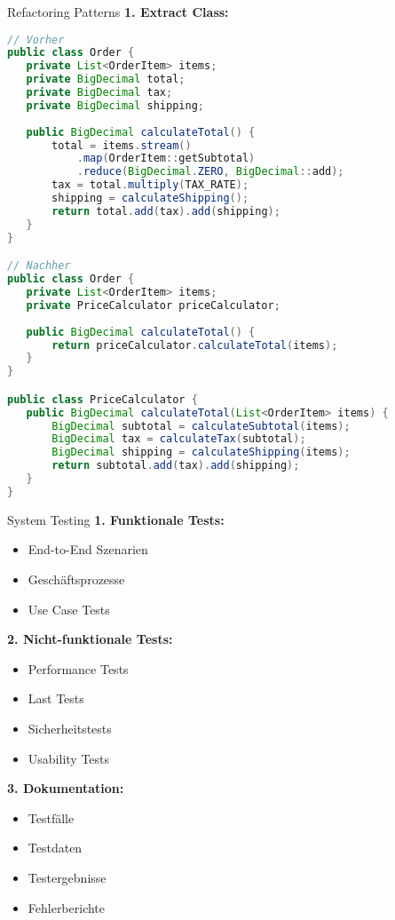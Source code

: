 \begin{example2}{Refactoring Patterns}
\textbf{1. Extract Class:}
\begin{lstlisting}[language=Java, style=basesmol]
// Vorher
public class Order {
   private List<OrderItem> items;
   private BigDecimal total;
   private BigDecimal tax;
   private BigDecimal shipping;
   
   public BigDecimal calculateTotal() {
       total = items.stream()
           .map(OrderItem::getSubtotal)
           .reduce(BigDecimal.ZERO, BigDecimal::add);
       tax = total.multiply(TAX_RATE);
       shipping = calculateShipping();
       return total.add(tax).add(shipping);
   }
}

// Nachher
public class Order {
   private List<OrderItem> items;
   private PriceCalculator priceCalculator;
   
   public BigDecimal calculateTotal() {
       return priceCalculator.calculateTotal(items);
   }
}

public class PriceCalculator {
   public BigDecimal calculateTotal(List<OrderItem> items) {
       BigDecimal subtotal = calculateSubtotal(items);
       BigDecimal tax = calculateTax(subtotal);
       BigDecimal shipping = calculateShipping(items);
       return subtotal.add(tax).add(shipping);
   }
}
\end{lstlisting}
\end{example2}

\begin{KR}{System Testing}
\textbf{1. Funktionale Tests:}
\begin{itemize}
   \item End-to-End Szenarien
   \item Geschäftsprozesse
   \item Use Case Tests
\end{itemize}

\textbf{2. Nicht-funktionale Tests:}
\begin{itemize}
   \item Performance Tests
   \item Last Tests
   \item Sicherheitstests
   \item Usability Tests
\end{itemize}

\textbf{3. Dokumentation:}
\begin{itemize}
   \item Testfälle
   \item Testdaten
   \item Testergebnisse
   \item Fehlerberichte
\end{itemize}
\end{KR}

